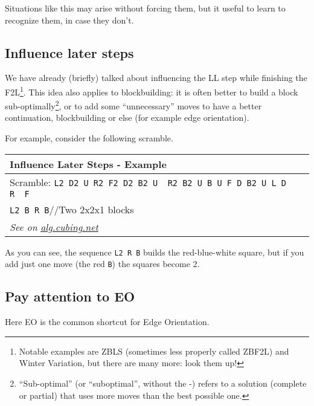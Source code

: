 \documentclass[11pt,a4paper]{book}
\newcommand{\p}{\textquotesingle}
\newcommand{\m}{\texttt}
\newcommand{\ps}{\p\,\,}
\newcommand{\comment}[1]{{\color{gray}\quad//#1}}
\begin{document}
Situations like this may arise without forcing them, but it useful to learn to recognize them, in case they don't.

\subsection{Influence later steps}

We have already (briefly) talked about influencing the LL step while finishing the F2L\footnote{Notable examples are ZBLS (sometimes less properly called ZBF2L) and Winter Variation, but there are many more: look them up!}. This idea also applies to blockbuilding: it is often better to build a block sub-optimally\footnote{``Sub-optimal'' (or ``suboptimal'', without the -) refers to a solution (complete or partial) that uses more moves than the best possible one.}, or to add some ``unnecessary'' moves to have a better continuation, blockbuilding or else (for example edge orientation).

For example, consider the following scramble.

\bigskip
\begin{tabular}{|p{}|}
\hline
\textbf{Influence Later Steps - Example}\\
\hline
Scramble: \m{L2 D2 U R2 F2 D2 B2 U\ps R2 B2 U B U F D B2 U L D\ps R\ps F}\\
\hline
\begin{minipage}[l]{0.650\textwidth}
\m{L2 {\color{red}B} R B}\comment{Two 2x2x1 blocks}
\end{minipage}
\begin{minipage}[c]{0.25\textwidth}

\end{minipage}\\
\hline
\emph{See on }\href{https://alg.cubing.net/?setup=L2_D2_U_R2_F2_D2_B2_U-_R2_B2_U_B_U_F_D_B2_U_L_D-_R-_F&alg=L2_B_R_B_\%2F\%2FTwo_2x2x1_blocks}{\emph{alg.cubing.net}}\\
\hline
\end{tabular}
\bigskip

As you can see, the sequence \m{L2 R B} builds the red-blue-white square, but if you add just one move (the red \m{B}) the squares become 2.

\subsection{Pay attention to EO}
\label{EO_attention}

Here EO is the common shortcut for Edge Orientation.
\end{document}

